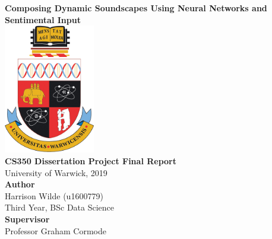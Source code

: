 \documentclass[12pt,]{article}
\title{}
\author{}
\date{}
\begin{document}

\null\vspace{\fill}
\begin{center}
\Huge{\textbf{Composing Dynamic Soundscapes Using Neural Networks and Sentimental Input}}\\
\vspace*{\baselineskip}
\includegraphics[width=150px]{Images/untitled.png}\\
\vspace*{\baselineskip}
\Large{\textbf{CS350 Dissertation Project Final Report}}\\
University of Warwick, 2019\\
\vspace*{\baselineskip}
\Large{\textbf{Author}}\\
Harrison Wilde (u1600779)\\
Third Year, BSc Data Science\\
\vspace*{\baselineskip}
\Large{\textbf{Supervisor}}\\
Professor Graham Cormode\\
\vspace*{3\baselineskip}
\end{center}
\vspace{\fill}

\onehalfspacing

\hypersetup{linkcolor = black}
\newpage
{}
\tableofcontents
\newpage
\setcounter{page}{3}
\listoffigures 
\newpage
\setcounter{page}{5}

\listoftables
\newpage
\hypersetup{linkcolor = red}
\end{document}
